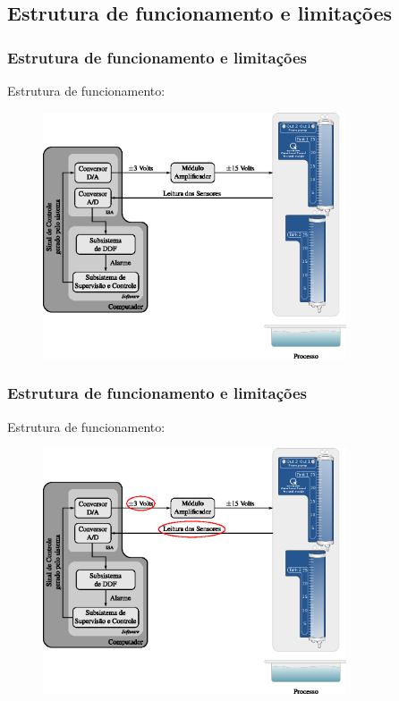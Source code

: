\documentclass{beamer}
\begin{document}
\subsection{Estrutura de funcionamento e limitações}
\begin{frame}
    \frametitle{Estrutura de funcionamento e limitações}

    Estrutura de funcionamento:

\begin{figure}[htb]
\centering
    \includegraphics[width=0.8\textwidth]{imgs/sistema/eps/func_sistema}
\end{figure}
\end{frame}

\begin{frame}
    \frametitle{Estrutura de funcionamento e limitações}

    Estrutura de funcionamento:

\begin{figure}[htb]
\centering
    \includegraphics[width=0.8\textwidth]{imgs/sistema/eps/func_sistema_mod}
\end{figure}
\end{frame}
\end{document}

